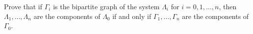 Prove that if $\Gamma_i$ is the bipartite graph of the system $\Lambda_i$ for $i = 0, 1, \ldots, n$, then $\Lambda_1, \ldots, \Lambda_n$ are the components of $\Lambda_0$ if and only if $\Gamma_1, \ldots, \Gamma_n$ are the components of $\Gamma_0$.
